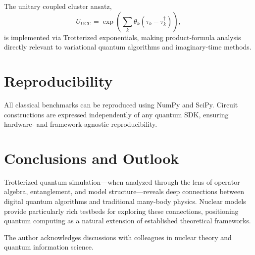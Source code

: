 \documentclass[
  aps,
  prxquantum,
  reprint,
  superscriptaddress,
  nofootinbib
]{revtex4-2}
\begin{document}
The unitary coupled cluster ansatz,
\begin{equation}
U_{\text{UCC}} = \exp\left(\sum_k \theta_k(\tau_k - \tau_k^\dagger)\right),
\end{equation}
is implemented via Trotterized exponentials, making product-formula analysis
directly relevant to variational quantum algorithms and imaginary-time methods.

\section{Reproducibility}

All classical benchmarks can be reproduced using NumPy and SciPy. Circuit
constructions are expressed independently of any quantum SDK, ensuring hardware-
and framework-agnostic reproducibility.

\section{Conclusions and Outlook}

Trotterized quantum simulation—when analyzed through the lens of operator
algebra, entanglement, and model structure—reveals deep connections between
digital quantum algorithms and traditional many-body physics. Nuclear models
provide particularly rich testbeds for exploring these connections, positioning
quantum computing as a natural extension of established theoretical frameworks.

\begin{acknowledgments}
The author acknowledges discussions with colleagues in nuclear theory and
quantum information science.
\end{acknowledgments}


\end{document}
